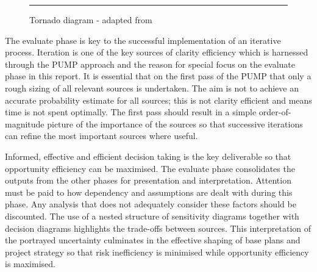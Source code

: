 \begin{figure}[!h]
  \centering
  \rule{5cm}{5cm}
\caption{Tornado diagram - adapted from \cite{hopkinson2008}}
\label{Figure:Tornado}
\end{figure}

The evaluate phase is key to the successful implementation of an iterative process.
Iteration is one of the key sources of clarity efficiency which is harnessed through the PUMP approach and the reason for special focus on the evaluate phase in this report.
It is essential that on the first pass of the PUMP that only a rough sizing of all relevant sources is undertaken.
The aim is not to achieve an accurate probability estimate for all sources; this is not clarity efficient and means time is not spent optimally.
The first pass should result in a simple order-of-magnitude picture of the importance of the sources so that successive iterations can refine the most important sources where useful.

Informed, effective and efficient decision taking is the key deliverable so that opportunity efficiency can be maximised.
The evaluate phase consolidates the outputs from the other phases for presentation and interpretation.
Attention must be paid to how dependency and assumptions are dealt with during this phase.
Any analysis that does not adequately consider these factors should be discounted.
The use of a nested structure of sensitivity diagrams together with decision diagrams \citep{chapman} highlights the trade-offs between sources.
This interpretation of the portrayed uncertainty culminates in the effective shaping of base plans and project strategy so that risk inefficiency is minimised while opportunity efficiency is maximised.




